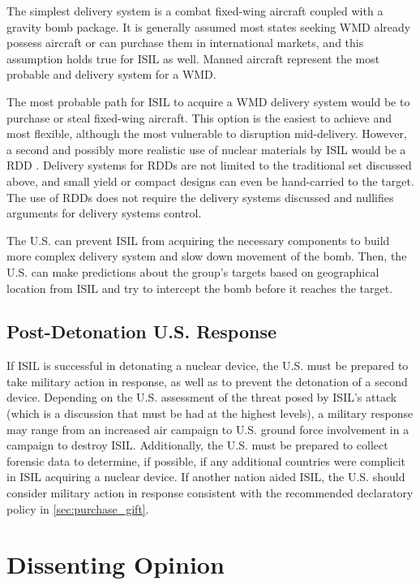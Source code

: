 \documentclass{report}
\begin{document}
The simplest delivery system is a combat fixed-wing aircraft coupled with a gravity bomb package. It is generally assumed most states seeking WMD already possess aircraft or can purchase them in international markets, and this assumption holds true for ISIL as well. Manned aircraft represent the most probable and delivery system for a WMD. 

The most probable path for ISIL to acquire a WMD delivery system would be to purchase or steal fixed-wing aircraft. This option is the easiest to achieve and most flexible, although the most vulnerable to disruption mid-delivery. However, a second and possibly more realistic use of nuclear materials by ISIL would be a RDD \cite{D.Esfandiary2014}. Delivery systems for RDDs are not limited to the traditional set discussed above, and small yield or compact designs can even be hand-carried to the target. The use of RDDs does not require the delivery systems discussed and nullifies arguments for delivery systems control. 


The U.S. can prevent ISIL from acquiring the necessary components to build more complex delivery system and slow down movement of the bomb.  Then, the U.S. can make predictions about the group's targets based on geographical location from ISIL and try to intercept the bomb before it reaches the target.  

\section{Post-Detonation U.S. Response}

If ISIL is successful in detonating a nuclear device, the U.S. must be prepared to take military action in response, as well as to prevent the detonation of a second device. Depending on the U.S. assessment of the threat posed by ISIL's attack (which is a discussion that must be had at the highest levels), a military response may range from an increased air campaign to U.S. ground force involvement in a campaign to destroy ISIL. Additionally, the U.S. must be prepared to collect forensic data to determine, if possible, if any additional countries were complicit in ISIL acquiring a nuclear device. If another nation aided ISIL, the U.S. should consider military action in response consistent with the recommended declaratory policy in \autoref{sec:purchase_gift}.



\chapter{Dissenting Opinion}
\end{document}
